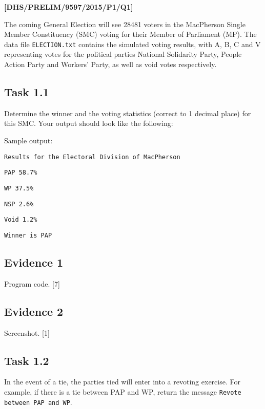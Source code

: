 \item \textbf{{[}DHS/PRELIM/9597/2015/P1/Q1{]} }

The coming General Election will see 28481 voters in the MacPherson
Single Member Constituency (SMC) voting for their Member of Parliament
(MP). The data file \texttt{ELECTION.txt} contains the simulated voting
results, with A, B, C and V representing votes for the political parties
National Solidarity Party, People Action Party and Workers' Party,
as well as void votes respectively. 

\subsection*{Task 1.1}

Determine the winner and the voting statistics (correct to 1 decimal
place) for this SMC. Your output should look like the following: 

Sample output: 

\noindent %
\noindent\begin{minipage}[t]{1\columnwidth}%
\texttt{Results for the Electoral Division of MacPherson }

\texttt{PAP 58.7\%}

\texttt{WP 37.5\%}

\texttt{NSP 2.6\% }

\texttt{Void 1.2\%}

\texttt{Winner is PAP }%
\end{minipage}

\subsection*{Evidence 1 }

Program code. \hfill{}{[}7{]}

\subsection*{Evidence 2}

Screenshot.\hfill{} {[}1{]}

\subsection*{Task 1.2}

In the event of a tie, the parties tied will enter into a revoting
exercise. For example, if there is a tie between PAP and WP, return
the message \textquotedbl\texttt{Revote between PAP and WP}\textquotedbl . 

